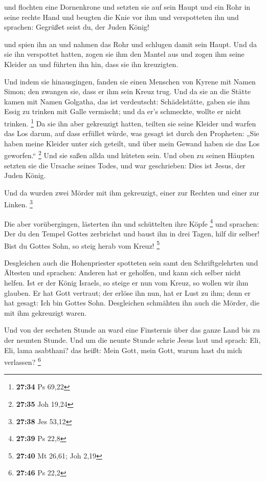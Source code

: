  und flochten eine Dornenkrone und setzten sie auf sein
Haupt und ein Rohr in seine rechte Hand und beugten die Knie vor ihm und
verspotteten ihn und sprachen: Gegrüßet seist du, der Juden König!

 und spien ihn an und nahmen das Rohr und schlugen damit
sein Haupt.  Und da sie ihn verspottet hatten, zogen sie
ihm den Mantel aus und zogen ihm seine Kleider an und führten ihn hin,
dass sie ihn kreuzigten.

 Und indem sie hinausgingen, fanden sie einen Menschen
von Kyrene mit Namen Simon; den zwangen sie, dass er ihm sein Kreuz
trug.  Und da sie an die Stätte kamen mit Namen Golgatha,
das ist verdeutscht: Schädelstätte,  gaben sie ihm Essig
zu trinken mit Galle vermischt; und da er's schmeckte, wollte er nicht
trinken. \footnote{\textbf{27:34} Ps 69,22}  Da sie ihn
aber gekreuzigt hatten, teilten sie seine Kleider und warfen das Los
darum, auf dass erfüllet würde, was gesagt ist durch den Propheten: „Sie
haben meine Kleider unter sich geteilt, und über mein Gewand haben sie
das Los geworfen.`` \footnote{\textbf{27:35} Joh 19,24} 
Und sie saßen allda und hüteten sein.  Und oben zu seinen
Häupten setzten sie die Ursache seines Todes, und war geschrieben: Dies
ist Jesus, der Juden König.

 Und da wurden zwei Mörder mit ihm gekreuzigt, einer zur
Rechten und einer zur Linken. \footnote{\textbf{27:38} Jes 53,12}

 Die aber vorübergingen, lästerten ihn und schüttelten
ihre Köpfe \footnote{\textbf{27:39} Ps 22,8}  und
sprachen: Der du den Tempel Gottes zerbrichst und baust ihn in drei
Tagen, hilf dir selber! Bist du Gottes Sohn, so steig herab vom Kreuz!
\footnote{\textbf{27:40} Mt 26,61; Joh 2,19}

 Desgleichen auch die Hohenpriester spotteten sein samt
den Schriftgelehrten und Ältesten und sprachen:  Anderen
hat er geholfen, und kann sich selber nicht helfen. Ist er der König
Israels, so steige er nun vom Kreuz, so wollen wir ihm glauben.
 Er hat Gott vertraut; der erlöse ihn nun, hat er Lust zu
ihm; denn er hat gesagt: Ich bin Gottes Sohn. 
Desgleichen schmähten ihn auch die Mörder, die mit ihm gekreuzigt waren.

 Und von der sechsten Stunde an ward eine Finsternis über
das ganze Land bis zu der neunten Stunde.  Und um die
neunte Stunde schrie Jesus laut und sprach: Eli, Eli, lama asabthani?
das heißt: Mein Gott, mein Gott, warum hast du mich verlassen?
\footnote{\textbf{27:46} Ps 22,2}


